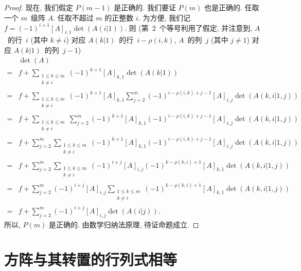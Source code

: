 \begin{proof}
    现在, 我们假定 \(P(m-1)\) 是正确的.
    我们要证 \(P(m)\) 也是正确的.
    任取一个 \(m\)~级阵 \(A\).
    任取不超过 \(m\) 的正整数 \(i\).
    为方便, 我们记
    \(f = (-1)^{i+1} [A]_{i,1} \det {(A(i|1))}\).
    则 (第~2~个等号利用了假定,
    并注意到,
    \(A\)~的行~\(i\) (其中 \(k \neq i\)) 对应
    \(A(k|1)\)~的行~\(i - \rho(i,k)\),
    \(A\)~的列~\(j\) (其中 \(j \neq 1\)) 对应
    \(A(k|1)\)~的列~\(j - 1\))
    \begin{align*}
             & \det {(A)}
        \\
        = {} &
        f + \sum_{\substack{1 \leq k \leq m \\k \neq i}}
        {(-1)^{k+1} [A]_{k,1} \det {(A(k|1))}}
        \\
        = {} &
        f + \sum_{\substack{1 \leq k \leq m \\k \neq i}}
        {(-1)^{k+1} [A]_{k,1}
        \sum_{j = 2}^{m}
        {(-1)^{i - \rho(i,k) + j - 1}
            [A]_{i,j} \det {(A(k,i|1,j))}}}
        \\
        = {} &
        f + \sum_{\substack{1 \leq k \leq m \\k \neq i}}
        {\sum_{j = 2}^{m}
        {(-1)^{k+1} [A]_{k,1}
        (-1)^{i - \rho(i,k) + j - 1}
            [A]_{i,j} \det {(A(k,i|1,j))}}}
        \\
        = {} &
        f + \sum_{j = 2}^{m}
        {\sum_{\substack{1 \leq k \leq m    \\k \neq i}}
        {(-1)^{k+1} [A]_{k,1}
            (-1)^{i - \rho(i,k) + j - 1}
                [A]_{i,j} \det {(A(k,i|1,j))}}}
        \\
        = {} &
        f + \sum_{j = 2}^{m}
        {\sum_{\substack{1 \leq k \leq m    \\k \neq i}}
        {(-1)^{i+j} [A]_{i,j}
            (-1)^{k - \rho(k,i) + 1}
                [A]_{k,1} \det {(A(k,i|1,j))}}}
        \\
        = {} &
        f + \sum_{j = 2}^{m}
        {(-1)^{i+j} [A]_{i,j}
        \sum_{\substack{1 \leq k \leq m     \\k \neq i}}
        {(-1)^{k - \rho(k,i) + 1}
                [A]_{k,1} \det {(A(k,i|1,j))}}}
        \\
        = {} &
        f + \sum_{j = 2}^{m}
        {(-1)^{i+j} [A]_{i,j} \det {(A(i|j))}}.
    \end{align*}
    所以, \(P(m)\) 是正确的.
    由数学归纳法原理, 待证命题成立.
\end{proof}

\section{方阵与其转置的行列式相等}

